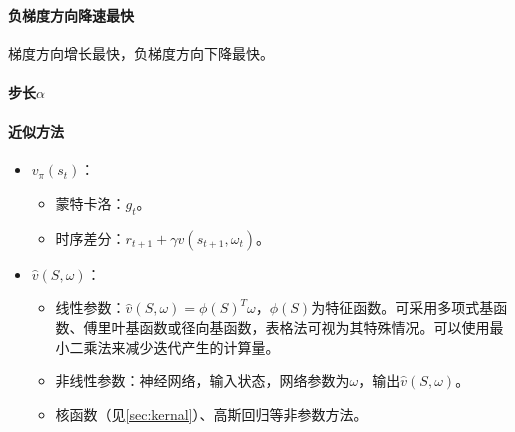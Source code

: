 \documentclass[
12pt, %
a4paper, 
oneside, %
headinclude,footinclude, %
]{scrartcl}
\begin{document}
\paragraph{负梯度方向降速最快}
梯度方向增长最快，负梯度方向下降最快。
\paragraph{步长$ \alpha $}
\paragraph{近似方法}\label{sec:kernal back}
\begin{itemize}
\item $ v_\pi(s_t) $：
\begin{itemize}
\item 蒙特卡洛：$ g_t $。
\item 时序差分：$ r_{t + 1} + \gamma \hat{v}(s_{t + 1}, \omega_t) $。
\end{itemize}
\item $ \hat{v}(S, \omega) $：
\begin{itemize}
\item 线性参数：$ \hat{v}(S, \omega) = \phi(S)^T \omega $，$ \phi(S) $为特征函数。可采用多项式基函数、傅里叶基函数或径向基函数，表格法可视为其特殊情况。可以使用最小二乘法来减少迭代产生的计算量。
\item 非线性参数：神经网络，输入状态，网络参数为$ \omega $，输出$ \hat{v}(S, \omega) $。
\item 核函数（见\ref{sec:kernal}）、高斯回归等非参数方法。
\end{itemize}
\end{itemize}
\end{document}
